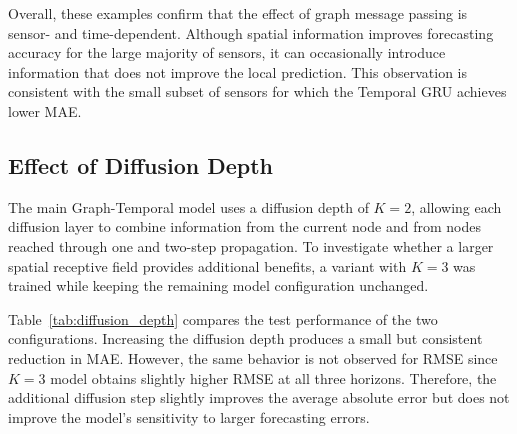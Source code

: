 Overall, these examples confirm that the effect of graph message passing is
sensor- and time-dependent. Although spatial information improves forecasting
accuracy for the large majority of sensors, it can occasionally introduce
information that does not improve the local prediction. This observation is
consistent with the small subset of sensors for which the Temporal GRU
achieves lower MAE.

\subsection{Effect of Diffusion Depth}
\label{subsec:diffusion_depth}

The main Graph-Temporal model uses a diffusion depth of $K=2$, allowing each
diffusion layer to combine information from the current node and from nodes
reached through one and two-step propagation. To investigate whether a
larger spatial receptive field provides additional benefits, a variant with
$K=3$ was trained while keeping the remaining model configuration unchanged.

Table~\ref{tab:diffusion_depth} compares the test performance of the two
configurations. Increasing the diffusion depth produces a small but consistent
reduction in MAE. However, the same behavior
is not observed for RMSE since $K=3$ model obtains slightly higher RMSE at all
three horizons. Therefore, the additional diffusion step
slightly improves the average absolute error but does not improve the model's
sensitivity to larger forecasting errors.


\begin{table}[t]
    \centering
    \caption{Test performance of the Graph-Temporal model with diffusion
    depths $K=2$ and $K=3$.}
    \label{tab:diffusion_depth}
\end{table}


